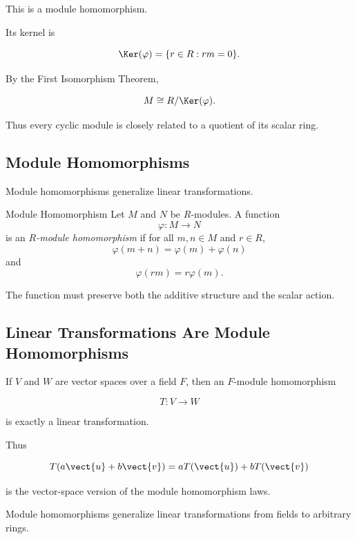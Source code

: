 This is a module homomorphism.

Its kernel is

\[ \Ker(\varphi)=\{r\in R:rm=0\}. \]

By the First Isomorphism Theorem,

\[ M\cong R/\Ker(\varphi). \]

Thus every cyclic module is closely related to a quotient of its scalar ring.

\subsection{Module Homomorphisms}
\label{subsec:module-homomorphisms}

Module homomorphisms generalize linear transformations.

\begin{definitionbox}{Module Homomorphism}
Let \(M\) and \(N\) be \(R\)-modules. A function
\[ \varphi:M\to N \]
is an \emph{\(R\)-module homomorphism} if for all \(m,n\in M\) and \(r\in R\),
\[ \varphi(m+n)=\varphi(m)+\varphi(n) \]
and
\[ \varphi(rm)=r\varphi(m). \]
\end{definitionbox}

The function must preserve both the additive structure and the scalar action.

\subsection{Linear Transformations Are Module Homomorphisms}
\label{subsec:linear-transformations-module-homomorphisms}

If \(V\) and \(W\) are vector spaces over a field \(F\), then an
\(F\)-module homomorphism

\[ T:V\to W \]

is exactly a linear transformation.

Thus

\[ T(a\vect{u}+b\vect{v})=aT(\vect{u})+bT(\vect{v}) \]

is the vector-space version of the module homomorphism laws.

\begin{importantbox}
Module homomorphisms generalize linear transformations from fields to
arbitrary rings.
\end{importantbox}

